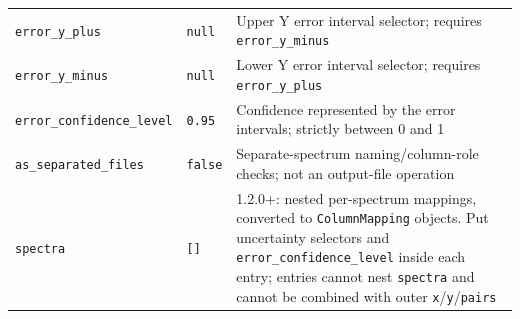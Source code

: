 \documentclass[
  10pt,
  a4paper,
  oneside]{scrreprt}
\begin{document}
\begin{longtable}[]{@{}lll@{}}
\begin{minipage}[t]{0.30\columnwidth}
\texttt{error\_y\_plus}\strut
\end{minipage} & \begin{minipage}[t]{0.30\columnwidth}\raggedright
\texttt{null}\strut
\end{minipage} & \begin{minipage}[t]{0.30\columnwidth}\raggedright
Upper Y error interval selector; requires \texttt{error\_y\_minus}\strut
\end{minipage}\tabularnewline
\begin{minipage}[t]{0.30\columnwidth}\raggedright
\texttt{error\_y\_minus}\strut
\end{minipage} & \begin{minipage}[t]{0.30\columnwidth}\raggedright
\texttt{null}\strut
\end{minipage} & \begin{minipage}[t]{0.30\columnwidth}\raggedright
Lower Y error interval selector; requires \texttt{error\_y\_plus}\strut
\end{minipage}\tabularnewline
\begin{minipage}[t]{0.30\columnwidth}\raggedright
\texttt{error\_confidence\_level}\strut
\end{minipage} & \begin{minipage}[t]{0.30\columnwidth}\raggedright
\texttt{0.95}\strut
\end{minipage} & \begin{minipage}[t]{0.30\columnwidth}\raggedright
Confidence represented by the error intervals; strictly between 0 and
1\strut
\end{minipage}\tabularnewline
\begin{minipage}[t]{0.30\columnwidth}\raggedright
\texttt{as\_separated\_files}\strut
\end{minipage} & \begin{minipage}[t]{0.30\columnwidth}\raggedright
\texttt{false}\strut
\end{minipage} & \begin{minipage}[t]{0.30\columnwidth}\raggedright
Separate-spectrum naming/column-role checks; not an output-file
operation\strut
\end{minipage}\tabularnewline
\begin{minipage}[t]{0.30\columnwidth}\raggedright
\texttt{spectra}\strut
\end{minipage} & \begin{minipage}[t]{0.30\columnwidth}\raggedright
\texttt{{[}{]}}\strut
\end{minipage} & \begin{minipage}[t]{0.30\columnwidth}\raggedright
1.2.0+: nested per-spectrum mappings, converted to
\texttt{ColumnMapping} objects. Put uncertainty selectors and
\texttt{error\_confidence\_level} inside each entry; entries cannot nest
\texttt{spectra} and cannot be combined with outer
\texttt{x}/\texttt{y}/\texttt{pairs}\strut
\end{minipage}\tabularnewline
\bottomrule
\end{longtable}
\end{document}
